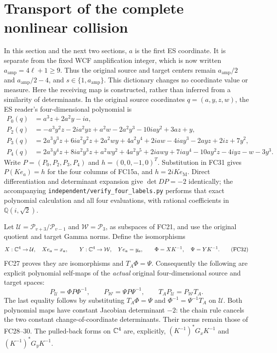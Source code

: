 \section{Transport of the complete nonlinear collision}
In this section and the next two sections, $a$ is the first ES coordinate.
It is separate from the fixed WCF amplification integer, which is now
written $a_{\mathrm{amp}}=4\ell+1\ge9$. Thus the original source and
target centers remain $a_{\mathrm{amp}}/2$ and
$a_{\mathrm{amp}}/2-4$, and $s\in\{1,a_{\mathrm{amp}}\}$.
This dictionary changes no coordinate value or measure.
Here the receiving map is constructed, rather than inferred from a
similarity of determinants. In the original source coordinates
$q=(a,y,z,w)$, the ES reader's four-dimensional polynomial is
\[
\begin{aligned}
 P_0(q)&=a^3z+2a^2y-ia,\\
 P_2(q)&=-a^3y^2z-2ia^2yz+a^2w-2a^2y^3-10iay^2+3az+y,\\
 P_3(q)&=2a^3y^3z+6ia^2y^2z+2a^2wy+4a^2y^4
             +2iaw-4iay^3-2ayz+2iz+7y^2,\\
 P_4(q)&=2a^3y^4z+8ia^2y^3z+a^2wy^2+4a^2y^5
             +2iawy+7iay^4-10ay^2z-4iyz-w-3y^3.
\end{aligned}\tag{FC31}
\]
Write $P=(P_0,P_2,P_3,P_4)$ and $h=(0,0,-1,0)^T$.
Substitution in FC31 gives $P(Ke_a)=h$ for the four columns of FC15a,
and $h=2iKe_{\mathrm M}$. Direct differentiation and determinant
expansion give $\det DP=-2$ identically; the accompanying
\texttt{independent/verify\_four\_labels.py} performs that exact
polynomial calculation and all four evaluations, with rational
coefficients in $\mathbb Q(i,\sqrt2)$.

Let $\mathcal U=\mathcal P_{v+3}/\mathcal P_{v-1}$ and
$\mathcal W=\mathcal P_3$, as subspaces of FC21, and use the original
quotient and target Gamma norms. Define the isomorphisms
\[
 X:\mathbb C^4\to\mathcal U,\quad Xe_a=x_a,\qquad
 Y:\mathbb C^4\to\mathcal W,\quad Ye_a=y_a,\qquad
 \Phi=XK^{-1},\quad\Psi=YK^{-1}.
 \tag{FC32}
\]
FC27 proves they are isomorphisms and $T_A\Phi=\Psi$.
Consequently the following are explicit polynomial self-maps of the
\emph{actual} original four-dimensional source and target spaces:
\[
 P_{\mathcal U}=\Phi P\Phi^{-1},\qquad
 P_{\mathcal W}=\Psi P\Psi^{-1},\qquad
 T_AP_{\mathcal U}=P_{\mathcal W}T_A.
 \tag{FC33}
\]
The last equality follows by substituting $T_A\Phi=\Psi$ and
$\Phi^{-1}=\Psi^{-1}T_A$ on $\mathcal U$. Both polynomial maps have
constant Jacobian determinant $-2$: the chain rule cancels the two
constant change-of-coordinate determinants. Their norms remain those
of FC28--30. The pulled-back forms on $\mathbb C^4$ are, explicitly,
$(K^{-1})^*G_xK^{-1}$ and $(K^{-1})^*G_yK^{-1}$.

